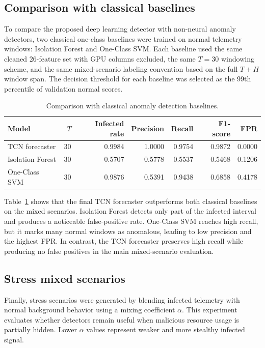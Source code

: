 \documentclass[a4paper,12pt]{extarticle}
\begin{document}
\subsection{Comparison with classical baselines}

To compare the proposed deep learning detector with non-neural anomaly detectors, two classical one-class baselines were trained on normal telemetry windows: Isolation Forest and One-Class SVM. Each baseline used the same cleaned 26-feature set with GPU columns excluded, the same $T=30$ windowing scheme, and the same mixed-scenario labeling convention based on the full $T+H$ window span. The decision threshold for each baseline was selected as the 99th percentile of validation normal scores.

\begin{table}[H]
\caption{Comparison with classical anomaly detection baselines.}
\label{tab:classical_baselines}
\centering
\small
\begin{tabular}{lrrrrrr}
\toprule
Model & $T$ & Infected rate & Precision & Recall & F1-score & FPR \\
\midrule
TCN forecaster & 30 & 0.9984 & 1.0000 & 0.9754 & 0.9872 & 0.0000 \\
Isolation Forest & 30 & 0.5707 & 0.5778 & 0.5537 & 0.5468 & 0.1206 \\
One-Class SVM & 30 & 0.9876 & 0.5391 & 0.9438 & 0.6858 & 0.4178 \\
\bottomrule
\end{tabular}
\end{table}

Table~\ref{tab:classical_baselines} shows that the final TCN forecaster outperforms both classical baselines on the mixed scenarios. Isolation Forest detects only part of the infected interval and produces a noticeable false-positive rate. One-Class SVM reaches high recall, but it marks many normal windows as anomalous, leading to low precision and the highest FPR. In contrast, the TCN forecaster preserves high recall while producing no false positives in the main mixed-scenario evaluation.

\subsection{Stress mixed scenarios}

Finally, stress scenarios were generated by blending infected telemetry with normal background behavior using a mixing coefficient $\alpha$. This experiment evaluates whether detectors remain useful when malicious resource usage is partially hidden. Lower $\alpha$ values represent weaker and more stealthy infected signal.
\end{document}
